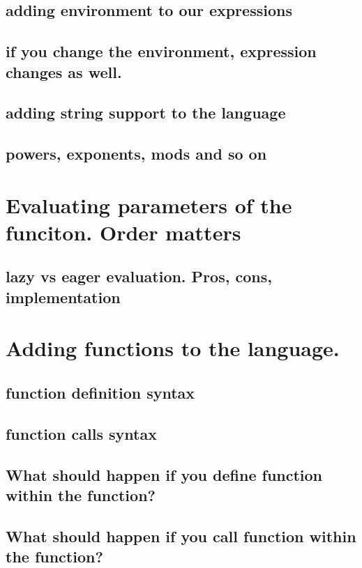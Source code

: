 \documentclass[11pt]{article}
\begin{document}
\subsection{adding environment to our expressions}
\label{sec:org85d739d}
\subsection{if you change the environment, expression changes as well.}
\label{sec:org6bd4302}
\subsection{adding string support to the language}
\label{sec:orgd405750}

\subsection{powers, exponents, mods and so on}
\label{sec:orgf0819df}
\section{Evaluating parameters of the funciton. Order matters}
\label{sec:org5bde0f4}
\subsection{lazy vs eager evaluation. Pros, cons, implementation}
\label{sec:orgc29dea4}
\section{Adding functions to the language.}
\label{sec:orgcf8ded0}
\subsection{function definition syntax}
\label{sec:orgabcad77}
\subsection{function calls syntax}
\label{sec:orgb251b3f}
\subsection{What should happen if you define function within the function?}
\label{sec:orgf100973}
\subsection{What should happen if you call function within the function?}
\label{sec:orga1c0064}
\end{document}

